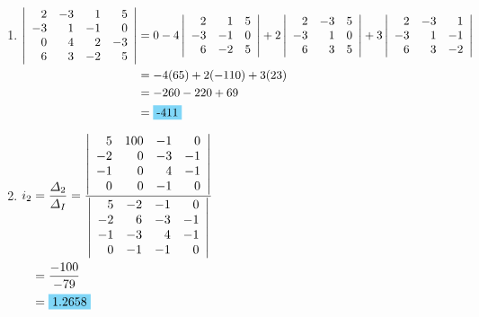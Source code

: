 \begin{enumerate}[leftmargin=2cm,labelsep=.5cm,label=\bfseries\alph*)]
	\item $
	\begin{aligned}[t]
	\left|
		\begin{array}{rrrr}
		2&-3&1&5 \\
		-3&1&-1&0 \\
		0&4&2&-3 \\
		6&3&-2&5 \\
		\end{array}
	\right| 
	&= 0
	-4\left|
		\begin{array}{rrr}
		2&1&5 \\
		-3&-1&0 \\
		6&-2&5 \\
		\end{array}
	\right|
	+2\left|
		\begin{array}{rrr}
		2&-3&5 \\
		-3&1&0 \\
		6&3&5 \\
		\end{array}
	\right| 
	+3\left|
		\begin{array}{rrr}
		2&-3&1 \\
		-3&1&-1 \\
		6&3&-2 \\
		\end{array}
	\right| \\
	&= -4(65)+2(-110)+3(23) \\
	&= -260-220+69 \\
	&= \hlbox{-411}
	\end{aligned} $
	\\[1cm]
	
	\item $
	\begin{aligned}[t]
	i_2 &= \frac{\Delta_2}{\Delta_I}
	=\frac{\left|
		\begin{array}{rrrr}
		5&100&-1&0 \\
		-2&0&-3&-1 \\
		-1&0&4&-1 \\
		0&0&-1&0 \\
		\end{array}
	\right|}{\left|
	\begin{array}{rrrr}
	5&-2&-1&0 \\
	-2&6&-3&-1 \\
	-1&-3&4&-1 \\
	0&-1&-1&0 \\
	\end{array}
	\right|} \\ 
	&= \frac{-100}{-79} \\
	&= \hlbox{1.2658}
	\end{aligned} $
	\\[1cm]
\end{enumerate}